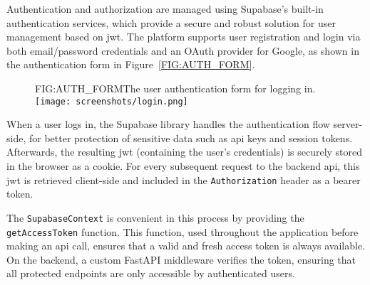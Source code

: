 Authentication and authorization are managed using Supabase's built-in authentication services, which provide a secure and robust solution for user management based on \ac{jwt}. The platform supports user registration and login via both email/password credentials and an OAuth provider for Google, as shown in the authentication form in Figure~\ref{FIG:AUTH_FORM}.

\begin{figure}[Login Form]{FIG:AUTH_FORM}{The user authentication form for logging in.}
    \texttt{[image: screenshots/login.png]}
\end{figure}

When a user logs in, the Supabase library handles the authentication flow server-side, for better protection of sensitive data such as \acs{api} keys and session tokens. Afterwards, the resulting \acs{jwt} (containing the user's credentials) is securely stored in the browser as a cookie. For every subsequent request to the backend \acs{api}, this \acs{jwt} is retrieved client-side and included in the \texttt{Authorization} header as a bearer token.

The \texttt{SupabaseContext} is convenient in this process by providing the \texttt{getAccessToken} function. This function, used throughout the application before making an \acs{api} call, ensures that a valid and fresh access token is always available. On the backend, a custom FastAPI middleware verifies the token, ensuring that all protected endpoints are only accessible by authenticated users.